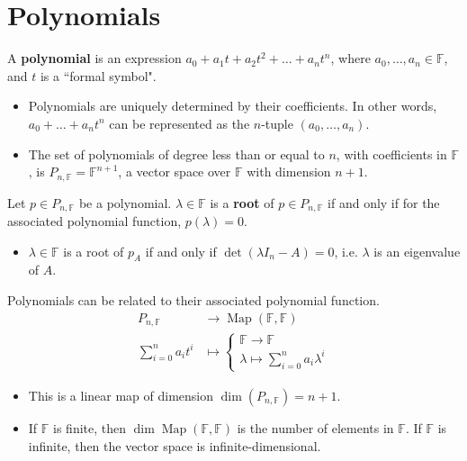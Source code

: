 \documentclass[letterpaper,12pt]{article}
\begin{document}
\section*{Polynomials}
\begin{definition}
A \textbf{polynomial} is an expression $a_0 + a_1 t + a_2 t^2 + \dots + a_n t^n$, where $a_0, \dots, a_n \in \mathbb{F}$, and $t$ is a ``formal symbol".
\begin{itemize}
    \item Polynomials are uniquely determined by their coefficients. In other words, $a_0 + \dots + a_n t^n$ can be represented as the $n$-tuple $(a_0, \dots, a_n)$.
    \item The set of polynomials of degree less than or equal to $n$, with coefficients in $\mathbb{F}$, is $P_{n, \mathbb{F}} = \mathbb{F}^{n+1}$, a vector space over $\mathbb{F}$ with dimension $n+1$. 
\end{itemize}
\end{definition}

\begin{definition}
Let $p \in P_{n, \mathbb{F}}$ be a polynomial. $\lambda \in \mathbb{F}$ is a \textbf{root} of $p \in P_{n, \mathbb{F}}$ if and only if for the associated polynomial function, $p(\lambda) = 0$. 
\begin{itemize}
    \item $\lambda \in \mathbb{F}$ is a root of $p_A$ if and only if $\det{(\lambda I_n - A)} = 0$, i.e. $\lambda$ is an eigenvalue of $A$.
\end{itemize}
\end{definition}

Polynomials can be related to their associated polynomial function.
\begin{align*}
    P_{n, \mathbb{F}} & \longrightarrow \operatorname{Map}(\mathbb{F}, \mathbb{F}) \\
    \sum_{i=0}^n a_i t^i & \longmapsto \begin{cases} \mathbb{F} \rightarrow \mathbb{F} \\ \lambda \longmapsto \sum_{i=0}^n a_i \lambda^i \end{cases}
\end{align*}
\begin{itemize}
    \item This is a linear map of dimension $\dim{(P_{n, \mathbb{F}})} = n+1$.
    \item If $\mathbb{F}$ is finite, then $\dim{\operatorname{Map}(\mathbb{F}, \mathbb{F})}$ is the number of elements in $\mathbb{F}$. If $\mathbb{F}$ is infinite, then the vector space is infinite-dimensional.
\end{itemize}
\end{document}
